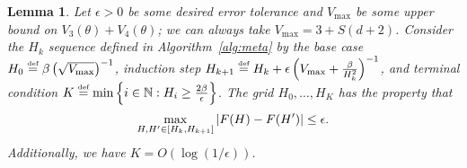 \documentclass[11pt]{article}
\newtheorem{lemma}[theorem]{Lemma}
\newcommand{\df}{\stackrel{\mbox{\rm\tiny def}}{=}}
\begin{document}
\begin{lemma}
\label{lem:H_grid_bound_discounted}
Let $\epsilon>0$ be some desired error tolerance and $V_{\max}$ be some upper bound on $V_3(\theta) + V_4(\theta)$; we can always take $V_{\max}= 3 + S(d+2)$. Consider the $H_k$ sequence defined in Algorithm~\ref{alg:meta} by the base case $H_0 \df  \beta\left(\sqrt{V_{\max}}\right)^{-1}$, induction step
$H_{k+1} \df H_k + \epsilon \left( V_{\max} +\frac{\beta }{H_k^2} \right)^{-1}$, and terminal condition
$ K \df \min\left\{i\in\nat : H_i \geq \frac{2\beta}{\epsilon}\right\}$.
The grid $H_0,\ldots, H_K$ has the property that 
\begin{equation}
  \max_{H,H' \in [H_k, H_{k+1}]} \left\vert F(H) - F(H')\right\vert\leq \epsilon.
\end{equation}
Additionally, we have $K = O(\log( 1/\epsilon))$.
\end{lemma}
\end{document}
